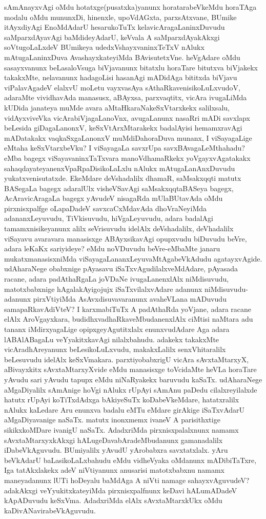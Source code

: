sAmAnayxvAgi oMdu hotatxge(pusatxka)yanunx horatarabeVkeMdu horaTAga modalu oMdu  mununxDi, hinenxle, upoVdAGxta, parxsAtxvane, BUmike itAyxdiyAgi EnoMdAdarU hesarukoTuTx kelavicAragaLaninxDuvudu saMparxdAyavAgi baMdideyAdarU, keVvala A saMparxdAyakAkxgi soVtugoLaLxdeV BUmikeya udedxVshayxvaninxTeTxV nAlukx mAtugaLaninxDuva AvashayxkateyiMda BAvisutetxVne. heVgAdare oMdu sasayxvanunx beLasaloVsuga biVjavanunx bitatxlu horaTare bitutxva biVjakekx takakxMte, nelavanunx hadagoLisi hasanAgi mADidAga bititxda biVjavu viPalavAgadeV elalxvU moLetu vayxvasAya sAthaRkavenisikoLuLxvudoV, adaraMte vividhavAda \hbox{manasusx}, aBAyxsa, parxvaqtitx, vicAra ivugaLiMda kUDida janateya muMde avara aMtaHkaraNakeSxVtarxkekx salilxsalu, vidAyxviveVka vicArabiVjagaLanoVnx, avugaLanunx nasaRri mADi savxlapx beLesida giDagaLanonxV, keSxVtArxMtarakekx badalAyisi hemamxravAgi mADatakakx vaqkaSxgaLanonxV muMdiDahoraDuva munanx, I viSayagaLige eMtaha keSxVtarxbeVku? I viSayagaLa savxrUpa savxBAvagaLeMthahadu? eMba bagegx viSayavaninxTaTxvara manoVdhamaRkekx yoVgayxvAgatakakx sahaqdayateyanenxVpaRpaDisikoLaLxlu nAlukx mAtugaLanAnxDuvudu yukatxvenisutatxde. EkeMdare deVshadalilx dhamaR, saMsakxqqti matutx BASegaLa bagegx adaralUlx visheVSavAgi saMsakxqqtaBASeya bagegx, AcAravicAragaLa bagegx yAvudeV nisagaRda mUlaBUtavAda oMdu pirxnisxpalfge oLapaDadeV savxcaCxMdavAda dhoVraNeyiMda adananxLeyuvudu, TiVkisuvudu, hiVgaLeyuvudu, adara badalAgi tamamxnisikeyanunx alilx seVrisuvudu idelAlx deVshadalilx, deVhadalilx viSayavu avaravara manasisxge ABAyxsikavAgi opupxvudu biDuvudu beVre, adara leKaKx sariyideye? eMdu noVDuvudu beVre-eMbaMte janaru mukatxmanasisxniMda viSayagaLananxLeyuvaMtAgabeVkAdudu agatayxvAgide. udAharaNege obabxnige pAyasavu iSaTxvAgudilalxveMdAdare, pAyasada racane, adara padAthaRgaLa  joVDaNe ivugaLanenxlAlx niMdisuvudu, matotxbabxnige hAgalakAyigojujx iSaTxvilalxvAdare adanunx niMdisuvudu- adanunx pirxVtiyiMda AsAvxdisuvavaranunx avaheVLana mADuvudu samapaRkavAdiVteV? I karxmabiTuTx A padAthaRda yoVjane, adara racane elAlx AroVgayxkara, budidhxvadhaRkaveMbudanenxlAlx ciMtisi naMtara adu tananx iMdirxyagaLige opipxgeyAgutitxlalx enunxvudAdare Aga adara lABAlABagaLu veYyakitxkavAgi nilalxbahudu. adakekx takakxMte vicAradhAreyanunx beLesikoLuLxvudu, makakxLalilx senxVhitaralilx beLesuvudu idelAlx keSxVmakara. parxtiyobabxrigU vicAra sAvxtaMtarxyX, aBivayxkitx sAvxtaMtarxyXvide eMdu manasisxge toVcidaMte heVLa horaTare yAvudu sari yAvudu tapupx eMdu niNaRyakekx baruvudu kaSaTx. udAharaNege aMgaDiyalilx sAmAnige hoVgi nAlukx rUpAyi sAmAnu paDedu cilalxreyilalxde hatutx rUpAyi koTiTxdAdxga bAkiyeSuTx koDabeVkeMdare, hatatxralilx nAlukx kaLedare Aru enunxva badalu eMTu eMdare girAkige iSaTxvAdarU aMgaDiyavanige naSaTx. matutx inonxmemx ivaneV A parisithxtige sikikxkoMDare ivanigU naSaTx. AdadxriMda pirxnisxpalalxnunx namamx sAvxtaMtarxyxkAkxgi hALugeDavabAradeMbudanunx gamanadalilx iDabeVkAguvudu. BUmiyalilx yAvudU yArobabxra savxtatxlalx. yAru beVkAdarU baLasikoLaLxbahudu eMdu vidheVyaka oMdanunx mADibiTaTxre, Iga tatAkxlakekx adeV niVtiyanunx anusarisi matotxbabxnu namamx maneyadanunx lUTi hoDeyalu baMdAga A niVti namage sahayxvAguvudeV? adakAkxgi veYyukitxkateyiMda pirxnisxpalfnunx keDavi hALumADadeV kApADuvudu keSxVma. AdadxriMda elAlx sAvxtaMtarxkUkx oMdu kaDivANavirabeVkAguvudu. 